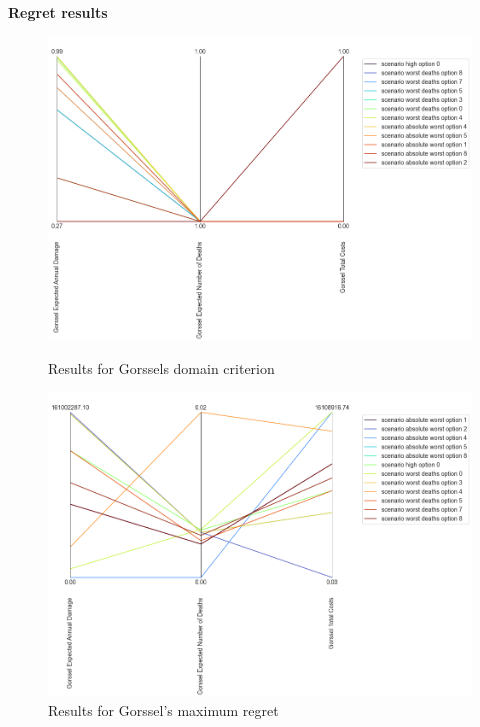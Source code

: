\textbf{Regret results} \newline



\begin{figure}[H]
  \centering
  \begin{minipage}[b]{0.4\textwidth}
    \includegraphics[width=1.15\textwidth]{report/figures/results/domain_criterion_Gorssel.png}
    \caption{Results for Gorssels domain criterion}
    \label{fig:domain_criterion_gorssel}
  \end{minipage}
  \hfill
  \begin{minipage}[b]{0.4\textwidth}
    \includegraphics[width=1.15\textwidth]{report/figures/results/regret_figure_Gorssel.png}
    \caption{Results for Gorssel's maximum regret}
    \label{fig:regret_gorssel}
  \end{minipage}
\end{figure}




